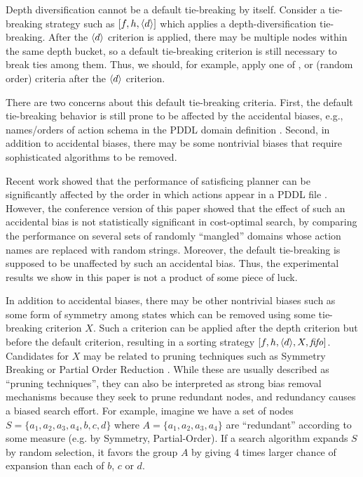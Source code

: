 Depth diversification cannot be a default tie-breaking by itself.
Consider a tie-breaking strategy such as $[f,h,{\left<d\right>}]$ which applies a depth-diversification tie-breaking.
After the ${\left<d\right>}$ criterion is applied, 
there may be multiple nodes within the same depth bucket, so a
default tie-breaking criterion is still necessary to break ties among them.
Thus, we should, for example, apply one of \lifo, \fifo or \ro (random order) criteria
after the ${\left<d\right>}$ criterion.

There are two concerns about this default tie-breaking criteria.
First, the default tie-breaking behavior is still prone to be
affected by the accidental biases, e.g., names/orders of action schema in the PDDL domain definition \cite{vallati2015effective}.
Second, in addition to accidental biases, there may be some nontrivial biases that require 
sophisticated algorithms to be removed.

Recent work  showed that the performance of satisficing
planner can be significantly affected by the order in which actions appear in a PDDL file \cite{vallati2015effective}.
However, the conference version of this paper \cite{Asai2016} showed that
the effect of such an accidental bias is not statistically significant in cost-optimal search,
by comparing the performance on
several sets of randomly ``mangled'' domains whose action names are replaced with random strings.
Moreover, the \ro default tie-breaking is supposed to be unaffected by such an accidental bias.
Thus, the experimental results we show in this paper is not a product of some piece of luck.

In addition to accidental biases, there may be other nontrivial biases such as some form of symmetry among states which can be removed using some tie-breaking criterion $X$.
Such a criterion can be applied after the depth criterion but before the default criterion,
resulting in a sorting strategy $[f,h,{\left<d\right>},X,{\text{\textit{fifo}}}]$. 
Candidates for $X$ may be related to pruning techniques such as Symmetry Breaking \cite{Fox1998,pochter2011exploiting,domshlak2013symmetry} or
Partial Order Reduction \cite{hall2013faster,wehrle2013relative}.
While these are usually described as ``pruning techniques'',
they can also be interpreted as strong bias removal mechanisms because
they seek to prune redundant nodes, and 
redundancy causes a biased search effort. For example, imagine we have a
set of nodes $S=\{a_1, a_2, a_3, a_4, b, c, d\}$ where
$A=\{a_1, a_2, a_3, a_4\}$ are ``redundant'' according to some measure (e.g. by Symmetry,
Partial-Order). 
If a search algorithm expands $S$ by random selection, it favors the
group $A$ by giving 4 times larger chance of expansion than each of $b$,
$c$ or $d$.

